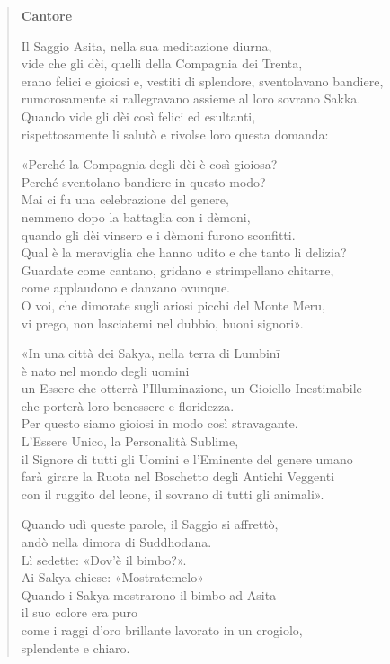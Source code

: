 \begin{quotation}
\textbf{Cantore}


Il Saggio Asita, nella sua meditazione diurna, \\
vide che gli dèi, quelli della Compagnia dei Trenta, \\
erano felici e gioiosi e, vestiti di splendore, sventolavano bandiere, \\
rumorosamente si rallegravano assieme al loro sovrano Sakka. \\
Quando vide gli dèi così felici ed esultanti, \\
rispettosamente li salutò e rivolse loro questa domanda:


«Perché la Compagnia degli dèi è così gioiosa? \\
Perché sventolano bandiere in questo modo? \\
Mai ci fu una celebrazione del genere, \\
nemmeno dopo la battaglia con i dèmoni, \\
quando gli dèi vinsero e i dèmoni furono sconfitti. \\
Qual è la meraviglia che hanno udito e che tanto li delizia? \\
Guardate come cantano, gridano e strimpellano chitarre, \\
come applaudono e danzano ovunque. \\
O voi, che dimorate sugli ariosi picchi del Monte Meru, \\
vi prego, non lasciatemi nel dubbio, buoni signori».


«In una città dei Sakya, nella terra di Lumbinī \\
è nato nel mondo degli uomini \\
un Essere che otterrà l’Illuminazione, un Gioiello Inestimabile \\
che porterà loro benessere e floridezza. \\
Per questo siamo gioiosi in modo così stravagante. \\
L’Essere Unico, la Personalità Sublime, \\
il Signore di tutti gli Uomini e l’Eminente del genere umano \\
farà girare la Ruota nel Boschetto degli Antichi Veggenti \\
con il ruggito del leone, il sovrano di tutti gli animali».


Quando udì queste parole, il Saggio si affrettò, \\
andò nella dimora di Suddhodana. \\
Lì sedette: «Dov’è il bimbo?». \\
Ai Sakya chiese: «Mostratemelo» \\
Quando i Sakya mostrarono il bimbo ad Asita \\
il suo colore era puro \\
come i raggi d’oro brillante lavorato in un crogiolo, \\
splendente e chiaro.



\end{quotation}
